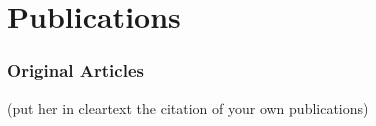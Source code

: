 \thispagestyle{empty}
\chapter*{Publications}\label{sec:publications}

\subsection*{Original Articles}

(put her in cleartext the citation of your own publications)

